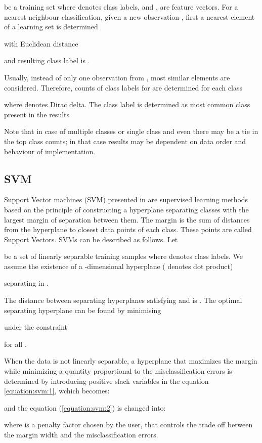 \documentclass[]{article}
\begin{document}
be a training set where  denotes class labels, and
, are feature vectors. For a nearest neighbour 
classification, given a new observation , first a nearest element 
 of a learning set is determined 

with Euclidean distance 

and resulting class label is .

Usually, instead of only one observation from ,  most similar elements are
considered. Therefore, counts of class labels for 
 are determined for each class

where  denotes Dirac delta.
The class label is determined as most common class present in the results


Note that in case of multiple classes or single class and even  there may be
a tie in the top class counts; in that case results may be dependent on data
order and behaviour of  implementation.

\subsection{SVM} \label{SVM}
Support Vector machines (SVM) presented in \cite{Byun:2002} are supervised
learning methods based on the principle of constructing a hyperplane separating
classes with the largest margin of separation between them. The margin is the
sum of distances from the hyperplane to closest data points of each class. These
points are called Support Vectors. SVMs  can be described as follows. Let 

be a set of linearly separable training samples where  denotes 
class labels. We assume the existence of a -dimensional hyperplane (
denotes dot product)

 separating  in .

The distance between separating hyperplanes satisfying  and  is 
. The optimal separating hyperplane can be found by 
minimising 

under the constraint

for all .

When the data is not linearly separable, a hyperplane that maximizes the margin
while minimizing a quantity proportional to the misclassification errors is
determined by introducing positive slack variables  in the equation
\ref{equation:svm:1}, wchich becomes:

and the equation (\ref{equation:svm:2}) is changed into:

where  is a penalty factor chosen by the user, that controls the trade off 
between the margin width and the misclassification errors. 
\end{document}
